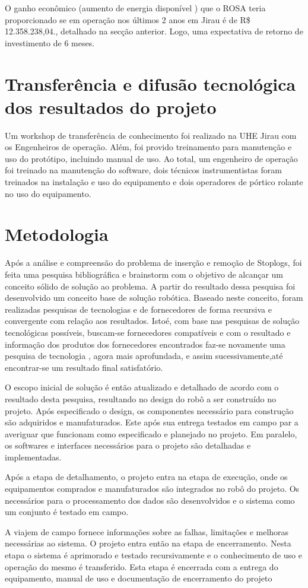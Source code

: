 O ganho econômico (aumento de energia disponível ) que o ROSA teria proporcionado 
se em operação nos últimos 2 anos em Jirau é de R\$ 12.358.238,04., detalhado
na secção anterior. Logo, uma expectativa de retorno de investimento de 6 meses.

\section*{Transferência e difusão tecnológica dos resultados do projeto}
Um workshop de transferência de conhecimento foi realizado na UHE Jirau com os
Engenheiros de operação. Além, foi provido treinamento para manutenção e uso do 
protótipo, incluindo manual de uso. Ao total, um engenheiro de operação foi 
treinado na manutenção do software, dois técnicos instrumentistas foram treinados 
na instalação e uso do equipamento e dois operadores de pórtico rolante no uso 
do equipamento.

\section*{Metodologia}

Após a análise e compreensão do problema de inserção e remoção de Stoplogs, foi 
feita uma pesquisa bibliográfica e brainstorm com o objetivo de alcançar um
conceito sólido de solução ao problema. A partir do resultado dessa pesquisa foi 
desenvolvido um conceito base de solução robótica. Baseado neste conceito, foram 
realizadas pesquisas de tecnologias e de fornecedores de forma recursiva e 
convergente com relação aos resultados. Istoé, com base nas pesquisas de solução 
tecnológicas possíveis, buscam-se fornecedores compatíveis e com o resultado e 
informação dos produtos dos fornecedores encontrados faz-se novamente uma pesquisa de 
tecnologia , agora mais aprofundada, e assim sucessivamente,até encontrar-se um 
resultado final satisfatório.  

O escopo inicial de solução é então atualizado e detalhado de acordo com o 
resultado desta pesquisa, resultando no design do robô a ser construído no projeto. 
Após especificado o design, os componentes necessário para construção são adquiridos
e manufaturados. Este após sua entrega testados em campo par a averiguar que 
funcionam como especificado e planejado no projeto. Em paralelo, os softwares e 
interfaces necessários para o projeto são detalhadas e implementadas.  

Após a etapa de detalhamento, o projeto entra na etapa de execução, onde os 
equipamentos comprados e manufaturados são integrados no robô do projeto. Os 
 necessários para o processamento dos dados são desenvolvidos e o sistema como 
 um conjunto é testado em campo. 

A viajem de campo fornece informações sobre as falhas, limitações e melhoras 
necessárias ao sistema. O projeto entra então na etapa de encerramento. Nesta 
etapa o sistema é aprimorado e testado recursivamente e o conhecimento de uso e 
operação do mesmo é transferido. Esta etapa é encerrada com a entrega do equipamento, 
manual de uso e documentação de encerramento do projeto

